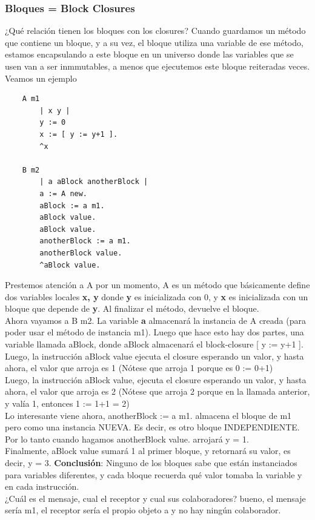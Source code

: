 \documentclass[10pt,a4paper]{article}
\begin{document}
\subsubsection*{Bloques = Block Closures}
¿Qué relación tienen los bloques con los closures? Cuando guardamos un método que contiene un bloque, y a su vez, el bloque utiliza una variable de ese método, estamos encapsulando a este bloque en un universo donde las variables que se usen van a ser inmmutables, a menos que ejecutemos este bloque reiteradas veces. \\
Veamos un ejemplo 
\begin{lstlisting}
    A m1 
        | x y |
        y := 0
        x := [ y := y+1 ].
        ^x

    B m2
        | a aBlock anotherBlock |
        a := A new.
        aBlock := a m1. 
        aBlock value. 
        aBlock value. 
        anotherBlock := a m1.
        anotherBlock value. 
        ^aBlock value.
\end{lstlisting}
Prestemos atención a A por un momento, A es un método que básicamente define dos variables locales \textbf{x, y} donde \textbf{y} es inicializada con 0, y \textbf{x} es inicializada con un bloque que depende de \textbf{y}. Al finalizar el método, devuelve el bloque. \\
Ahora vayamos a B m2. La variable \textbf{a} almacenará la instancia de A creada (para poder usar el método de instancia m1). Luego que hace esto hay dos partes, una variable llamada aBlock, donde aBlock almacenará el block-closure [ y := y+1 ]. \\
Luego, la instrucción aBlock value ejecuta el closure esperando un valor, y hasta ahora, el valor que arroja es 1 (Nótese que arroja 1 porque es 0 := 0+1) \\
Luego, la instrucción aBlock value, ejecuta el closure esperando un valor, y hasta ahora, el valor que arroja es 2 (Nótese que arroja 2 porque en la llamada anterior, y valía 1, entonces 1 := 1+1 = 2) \\
Lo interesante viene ahora, anotherBlock := a m1. almacena el bloque de m1 pero como una instancia NUEVA. Es decir, es otro bloque INDEPENDIENTE. \\
Por lo tanto cuando hagamos anotherBlock value. arrojará y = 1. \\
Finalmente, aBlock value sumará 1 al primer bloque, y retornará su valor, es decir, y = 3. 
\textbf{Conclusión}: Ninguno de los bloques sabe que están instanciados para variables diferentes, y cada bloque recuerda qué valor tomaba la variable y en cada instrucción. \\
¿Cuál es el mensaje, cual el receptor y cual sus colaboradores? bueno, el mensaje sería m1, el receptor sería el propio objeto a y no hay ningún colaborador.
\end{document}

